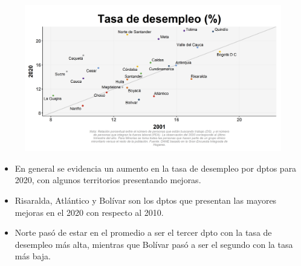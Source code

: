     \begin{figure}[H]
        \caption[Tasa de desempleo por departamentos - 2010 VS 2020 ]{\label{desemp_dpto_scatter} }
        \begin{center}
        \includegraphics[width=\textwidth,keepaspectratio]{img/var_47_scatter_time.png}
        \end{center}
    \end{figure}
            \begin{itemize}
                \item En general se evidencia un aumento en la tasa de desempleo por dptos para 2020, con algunos territorios presentando mejoras.
                \item Risaralda, Atlántico y Bolívar son los dptos que presentan las mayores mejoras en el 2020 con respecto al 2010.
                \item Norte pasó de estar en el promedio a ser el tercer dpto con la tasa de desempleo más alta, mientras que Bolívar pasó a ser el segundo con la tasa más baja.
                \end{itemize}

